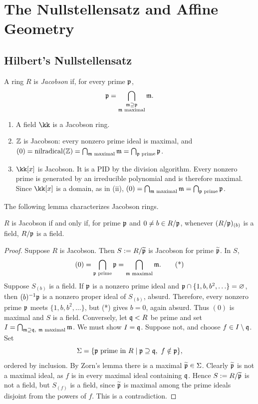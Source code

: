 \documentclass[11pt,a4paper]{article}
\begin{document}
\section*{The Nullstellensatz and Affine Geometry}
\subsection{Hilbert's Nullstellensatz}
\setcounter{definition}{14}\begin{definition}
A ring $R$ is \emph{Jacobson} if, for every prime $\mathfrak p$,
\[\mathfrak p=\bigcap_{\substack{\mathfrak m\supseteq\mathfrak p\\\mathfrak m\text{ maximal}}}\mathfrak m.\]
\end{definition}
\setcounter{example}{8}\begin{example}
\begin{enumerate}[label=(\roman*)]
\setcounter{enumi}{0}\item A field $\kk$ is a Jacobson ring.
\setcounter{enumi}{1}\item $\mathbb{Z}$ is Jacobson: every nonzero prime ideal is maximal, and $(0)=\operatorname{nilradical}(\mathbb{Z})=\bigcap_{\mathfrak m\text{ maximal}}\mathfrak m=\bigcap_{\mathfrak p\text{ prime}}\mathfrak p$.
\setcounter{enumi}{2}\item $\kk[x]$ is Jacobson. It is a PID by the division algorithm. Every nonzero prime is generated by an irreducible polynomial and is therefore maximal. Since $\kk[x]$ is a domain, as in (ii), $(0)=\bigcap_{\mathfrak m\text{ maximal}}\mathfrak m=\bigcap_{\mathfrak p\text{ prime}}\mathfrak p$.
\end{enumerate}
\end{example}
The following lemma characterizes Jacobson rings.
\setcounter{theorem}{23}\begin{lemma}
$R$ is Jacobson if and only if, for prime $\mathfrak p$ and $0\ne b\in R/\mathfrak p$, whenever $(R/\mathfrak p)_{(b)}$ is a field, $R/\mathfrak p$ is a field.
\end{lemma}
\begin{proof}
Suppose $R$ is Jacobson. Then $S:=R/\widetilde{\mathfrak p}$ is Jacobson for prime $\widetilde{\mathfrak p}$. In $S$,
\[(0)=\bigcap_{\mathfrak p\text{ prime}}\mathfrak p=\bigcap_{\mathfrak m\text{ maximal}}\mathfrak m.\tag{*}\]
Suppose $S_{(b)}$ is a field. If $\mathfrak p$ is a nonzero prime ideal and $\mathfrak p\cap\{1,b,b^2,\ldots\}=\varnothing$, then $(b)^{-1}\mathfrak p$ is a nonzero proper ideal of $S_{(b)}$, absurd. Therefore, every nonzero prime $\mathfrak p$ meets $\{1,b,b^2,\ldots\}$, but (*) gives $b=0$, again absurd. Thus $(0)$ is maximal and $S$ is a field.
Conversely, let $\mathfrak q<R$ be prime and set $I=\bigcap_{\mm\supseteq\qq,\ \mm\text{ maximal}}\mm$. We must show $I=\mathfrak q$. Suppose not, and choose $f\in I\setminus\mathfrak q$. Set
\[\Sigma=\{\mathfrak p\text{ prime in }R\mid\mathfrak p\supseteq\mathfrak q,\ f\notin\mathfrak p\},\]
ordered by inclusion. By Zorn's lemma there is a maximal $\widetilde{\mathfrak p}\in\Sigma$. Clearly $\widetilde{\mathfrak p}$ is not a maximal ideal, as $f$ is in every maximal ideal containing $\mathfrak q$. Hence $S:=R/\widetilde{\mathfrak p}$ is not a field, but $S_{(f)}$ is a field, since $\widetilde{\mathfrak p}$ is maximal among the prime ideals disjoint from the powers of $f$. This is a contradiction.
\end{proof}
\end{document}
